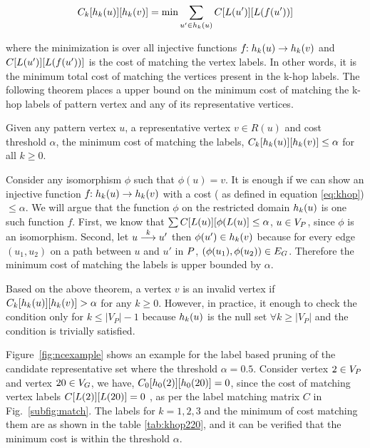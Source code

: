  \begin{equation} \label{eq:khop} \khopcost{k}{u}{v} =
     \text{min}\displaystyle\sum_{u' \in \khopl{k}{u}}
     \matij{C}{L(u')}{L(f(u'))} \end{equation}

 where the minimization is over all injective functions $f\!\!:\khopl{k}{u}
 \rightarrow \khopl{k}{v}$ and $\matij{C}{L(u')}{L(f(u'))}$ is the cost of
 matching the vertex labels.  In other words, it is the minimum total cost of
 matching the vertices present in the k-hop labels.  The following theorem
 places a upper bound on the minimum cost of matching the k-hop labels of
 pattern vertex and any of its representative vertices.


\begin{thm} Given any pattern vertex $u$, a representative vertex $v \in R(u)$
    and cost threshold $\alpha$, the minimum cost of matching the \khop labels,
    $\khopcost{k}{u}{v} \leq \alpha$ for all $k \geq 0$.

\begin{myproof} Consider any isomorphism $\phi$ such that $\phi(u) = v$. It is
    enough if we can show an injective function $f\!\!:\khopl{k}{u} \rightarrow
    \khopl{k}{v}$ with a cost ( as defined in equation \ref{eq:khop}) $\leq
    \alpha$. We will argue that the function $\phi$ on the restricted domain
    $\khopl{k}{u}$ is one such function $f$.  First, we know that
    $\sum\matij{C}{L(u)}{\phi(L(u)} \leq \alpha$, $u \in \vp$, since $\phi$ is
    an isomorphism. Second, let $\kpath{u}{u'}{k}$ then $\phi(u') \in
    \khopl{k}{v}$ because for every edge $(u_1, u_2)$ on a path between $u$ and
    $u'$ in $\pat$, $(\phi(u_1),\phi(u_2)) \in \eg$.  Therefore the minimum cost
    of matching the \khop labels is upper bounded by $\alpha$.  \end{myproof}
    \label{thm:khop} \end{thm}

Based on the above theorem, a vertex $v$ is an invalid vertex if
$\khopcost{k}{u}{v} > \alpha$ for any $k \geq 0$. However, in practice, it
enough to check the condition only for $k \leq |V_P|-1$ because $\khopl{k}{u}$
is the null set $\forall k \geq |V_P|$ and the condition is trivially satisfied.

Figure~\ref{fig:ncexample} shows an example for the \khop label based pruning of
the candidate representative set where the threshold $\alpha = 0.5$. Consider
vertex $2 \in \vp$ and vertex $20 \in \vg$, we have, $\khopcost{0}{2}{20} = 0$,
since the cost of matching vertex labels $\matij{C}{L(2)}{L(20)} = 0$ , as per
the label matching matrix $C$ in Fig.~\ref{subfig:match}. The \khop labels for
$k=1,2,3$ and the minimum of cost matching them are as shown in the table
\ref{tab:khop220}, and it can be verified that the minimum cost is within the
threshold $\alpha$.

